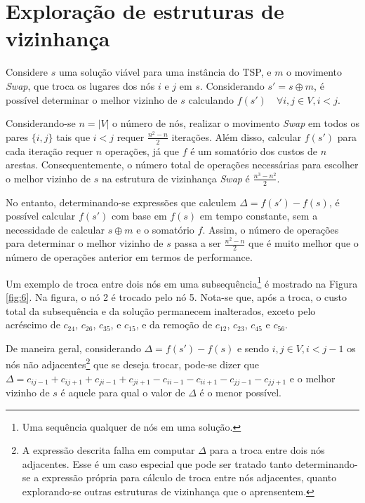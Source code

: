 \section{Exploração de estruturas de vizinhança}

Considere \(s\) uma solução viável para uma instância do TSP, e \(m\) o movimento \textit{Swap}, que troca os lugares dos nós \(i\) e \(j\) em \(s\). Considerando \(s' = s \oplus m \), é possível determinar o melhor vizinho de \(s\) calculando \( f(s') \quad \forall i, j \in V, i < j\).

Considerando-se \(n = |V|\) o número de nós, realizar o movimento \textit{Swap} em todos os pares \(\{i,j\}\) tais que \(i<j\) requer \(\frac{n^2-n}{2}\) iterações. Além disso, calcular \(f(s')\) para cada iteração requer \(n\) operações, já que \(f\) é um somatório dos custos de \(n\) arestas. Consequentemente, o número total de operações necessárias para escolher o melhor vizinho de \(s\) na estrutura de vizinhança \textit{Swap} é \(\frac{n^3-n^2}{2}\). 

No entanto, determinando-se expressões que calculem \(\Delta = f(s') - f(s)\), é possível calcular \(f(s')\) com base em \(f(s)\) em tempo constante, sem a necessidade de calcular \(s \oplus m\) e o somatório \(f\). Assim, o número de operações para determinar o melhor vizinho de \(s\) passa a ser \(\frac{n^2-n}{2}\) que é muito melhor que o número de operações anterior em termos de performance.

Um exemplo de troca entre dois nós em uma subsequência\footnote{Uma sequência qualquer de nós em uma solução.} é mostrado na Figura \ref{fig:6}. Na figura, o nó 2 é trocado pelo nó 5. Nota-se que, após a troca, o custo total da subsequência e da solução permanecem inalterados, exceto pelo acréscimo de \(c_{24}\), \(c_{26}\), \(c_{35}\), e \(c_{15}\), e da remoção de \(c_{12}\), \(c_{23}\), \(c_{45}\) e \(c_{56}\).

De maneira geral, considerando \(\Delta = f(s') - f(s)\) e sendo \(i,j \in V, i  < j-1\) os nós não adjacentes\footnote{A expressão descrita falha em computar \(\Delta\) para a troca entre dois nós adjacentes. Esse é um caso especial que pode ser tratado tanto determinando-se a expressão própria para cálculo de troca entre nós adjacentes, quanto explorando-se outras estruturas de vizinhança que o aprensentem.} que se deseja trocar, pode-se dizer que \(\Delta =  c_{ij-1} + c_{ij+1} + c_{ji-1} + c_{ji+1} - c_{ii-1} - c_{ii+1} - c_{jj-1} - c_{jj+1}\) e o melhor vizinho de \(s\) é aquele para qual o valor de \(\Delta\) é o menor possível. 

